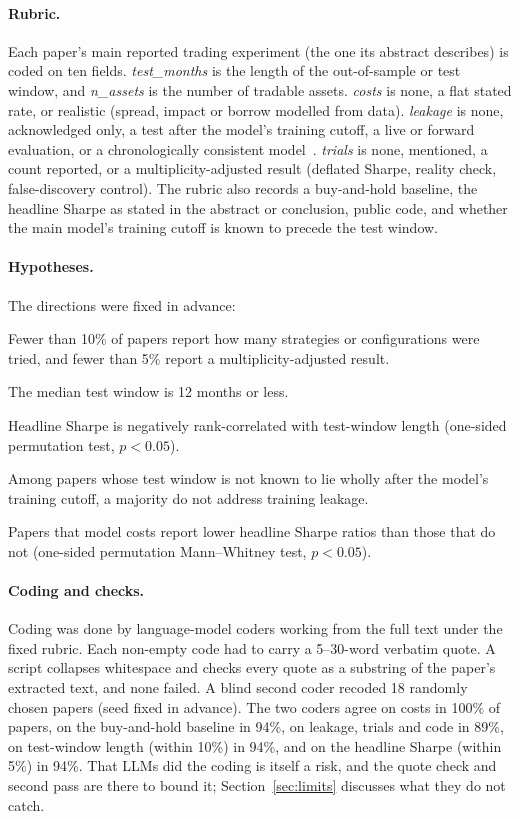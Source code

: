 \documentclass[11pt]{article}
\begin{document}
\paragraph{Rubric.} Each paper's main reported trading experiment (the one its
abstract describes) is coded on ten fields. \emph{test\_months} is the length of
the out-of-sample or test window, and \emph{n\_assets} is the number of
tradable assets. \emph{costs} is none, a flat stated rate, or realistic
(spread, impact or borrow modelled from data). \emph{leakage} is none,
acknowledged only, a test after the model's training cutoff, a live or forward
evaluation, or a chronologically consistent model~\cite{he2025chrono}.
\emph{trials} is none, mentioned, a count reported, or a multiplicity-adjusted
result (deflated Sharpe, reality check, false-discovery control). The rubric
also records a buy-and-hold baseline, the headline Sharpe as stated in the
abstract or conclusion, public code, and whether the main model's training
cutoff is known to precede the test window.

\paragraph{Hypotheses.} The directions were fixed in advance:
\begin{description}[leftmargin=*,itemsep=1pt]
\item[H1] Fewer than 10\% of papers report how many strategies or configurations
were tried, and fewer than 5\% report a multiplicity-adjusted result.
\item[H2] The median test window is 12 months or less.
\item[H3] Headline Sharpe is negatively rank-correlated with test-window length
(one-sided permutation test, $p<0.05$).
\item[H4] Among papers whose test window is not known to lie wholly after the
model's training cutoff, a majority do not address training leakage.
\item[H5] Papers that model costs report lower headline Sharpe ratios than those
that do not (one-sided permutation Mann--Whitney test, $p<0.05$).
\end{description}

\paragraph{Coding and checks.} Coding was done by language-model coders working
from the full text under the fixed rubric. Each non-empty code had to carry a
5--30-word verbatim quote. A script collapses whitespace and checks every quote
as a substring of the paper's extracted text, and none failed. A blind
second coder recoded 18 randomly chosen papers (seed fixed in advance). The
two coders agree on costs in 100\% of papers, on the buy-and-hold baseline in
94\%, on leakage, trials and code in 89\%, on test-window length (within 10\%)
in 94\%, and on the headline Sharpe (within 5\%) in 94\%. That LLMs did the
coding is itself a risk, and the quote check and second pass are there to
bound it; Section~\ref{sec:limits} discusses what they do not catch.
\end{document}
